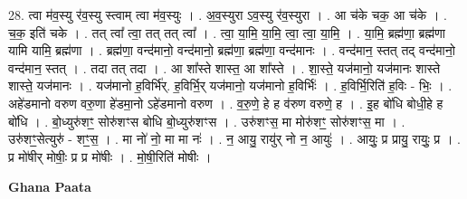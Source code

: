 \documentclass[17pt]{extarticle}
\begin{document}
28. त्वा म॑व॒स्यु र॑व॒स्यु स्त्वाम् त्वा म॑व॒स्युः । . अ॒व॒स्युरा ऽव॒स्यु र॑व॒स्युरा । . आ च॑के चक॒ आ च॑के । . च॒क॒ इति॑ चके । . तत् त्वा᳚ त्वा॒ तत् तत् त्वा᳚ । . त्वा॒ या॒मि॒ या॒मि॒ त्वा॒ त्वा॒ या॒मि॒ । . या॒मि॒ ब्रह्म॑णा॒ ब्रह्म॑णा यामि यामि॒ ब्रह्म॑णा । . ब्रह्म॑णा॒ वन्द॑मानो॒ वन्द॑मानो॒ ब्रह्म॑णा॒ ब्रह्म॑णा॒ वन्द॑मानः । . वन्द॑मान॒ स्तत् तद् वन्द॑मानो॒ वन्द॑मान॒ स्तत् । . तदा तत् तदा । . आ शा᳚स्ते शास्त॒ आ शा᳚स्ते । . शा॒स्ते॒ यज॑मानो॒ यज॑मानः शास्ते शास्ते॒ यज॑मानः । . यज॑मानो ह॒विर्भि॑र्. ह॒विर्भि॒र् यज॑मानो॒ यज॑मानो ह॒विर्भिः॑ । . ह॒विर्भि॒रिति॑ ह॒विः - भिः॒ । . अहे॑डमानो वरुण वरु॒णा हे॑डमा॒नो ऽहे॑डमानो वरुण । . व॒रु॒णे॒ हे ह व॑रुण वरुणे॒ ह । . इ॒ह बो॑धि बोधी॒हे ह बो॑धि । . बो॒ध्युरु॑शꣳ॒॒ सोरु॑शꣳस बोधि बो॒ध्युरु॑शꣳस । . उरु॑शꣳस॒ मा मोरु॑शꣳ॒॒ सोरु॑शꣳस॒ मा । . उरु॑शꣳ॒॒सेत्युरु॑ - शꣳ॒॒स॒ । . मा नो॑ नो॒ मा मा नः॑ । . न॒ आयु॒ रायु॑र् नो न॒ आयुः॑ । . आयुः॒ प्र प्रायु॒ रायुः॒ प्र । . प्र मो॑षीर् मोषीः॒ प्र प्र मो॑षीः । . मो॒षी॒रिति॑ मोषीः । \newline

\textbf{Ghana Paata } \newline
\end{document}

